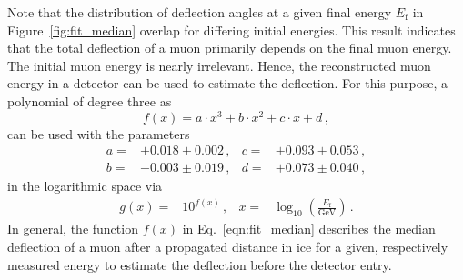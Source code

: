Note that the distribution of deflection angles at a given final energy $E_{\mathrm{f}}$ in Figure~\ref{fig:fit_median} overlap for differing initial energies. This result indicates that the total deflection of a muon 
primarily depends on the final muon energy.
The initial muon energy is nearly irrelevant. 
Hence, the reconstructed muon 
energy in a detector can be used to estimate the deflection. For this 
purpose, a polynomial of degree three as 
\begin{equation}
     f(x) = a \cdot x^3 + b \cdot x^2 + c \cdot x + d \,,
    \label{eqn:fit_median}
\end{equation} 
can be used with the parameters 
\begin{align*}
    a =& +0.018\pm 0.002\,,  & c =& +0.093\pm 0.053\,,\\
    b =& -0.003\pm 0.019\,,  & d =& +0.073\pm 0.040\,,
\end{align*}
in the logarithmic space via 
\begin{align}
    g(x) =& 10^{f(x)}\,, & x =& \log_{10}\left(\frac{E_{\text{f}}}{\si{\giga\electronvolt}}\right)\,.
\end{align}
In general, the function $f(x)$ in Eq.~\eqref{eqn:fit_median} describes the median 
deflection of a muon after a propagated distance in ice for a given, respectively measured energy 
to estimate the deflection before the detector entry.


